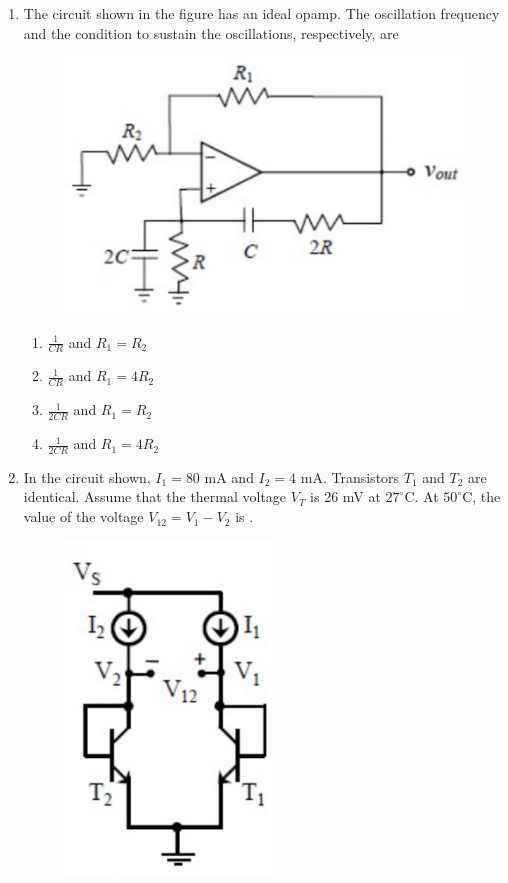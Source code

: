 \documentclass[a4paper, 11pt]{article}
\begin{document}
\begin{enumerate}
    \item The circuit shown in the figure has an ideal opamp. The oscillation frequency and the condition to sustain the oscillations, respectively, are
    \begin{figure}[H]
        \centering
        \includegraphics[width=0.5\columnwidth]{figs/q51.png}
        \caption*{}
        \label{fig:q51}
    \end{figure}
    \begin{enumerate}
        \item $\frac{1}{CR}$ and $R_{1}=R_{2}$
        \item $\frac{1}{CR}$ and $R_{1}=4R_{2}$
        \item $\frac{1}{2CR}$ and $R_{1}=R_{2}$
        \item $\frac{1}{2CR}$ and $R_{1}=4R_{2}$
    \end{enumerate}
    
    \hfill{}

    \item In the circuit shown, $I_{1}=80$ mA and $I_{2}=4$ mA. Transistors $T_{1}$ and $T_{2}$ are identical. Assume that the thermal voltage $V_{T}$ is 26 mV at $27^{\circ}$C. At $50^{\circ}$C, the value of the voltage $V_{12}=V_{1}-V_{2}$  is \underline{\hspace{2cm}}.
    \begin{figure}[H]
        \centering
        \includegraphics[width=0.3\columnwidth]{figs/q52.png}
        \caption*{}
        \label{fig:q52}
    \end{figure}
    

\end{enumerate}
\end{document}
